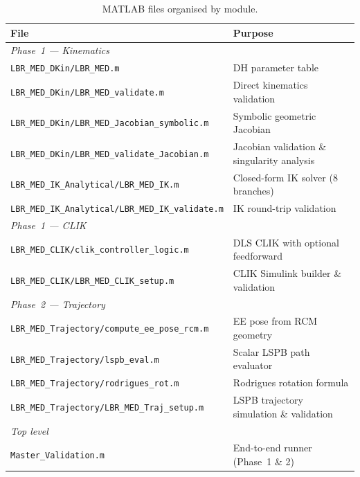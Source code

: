 \documentclass[11pt,a4paper]{article}
\begin{document}
\begin{table}[H]
  \centering
  \caption{MATLAB files organised by module.}
  \begin{tabular}{ll}
    \toprule
    File & Purpose \\
    \midrule
    \multicolumn{2}{l}{\textit{Phase~1 — Kinematics}} \\
    \texttt{LBR\_MED\_DKin/LBR\_MED.m}                       & DH parameter table \\
    \texttt{LBR\_MED\_DKin/LBR\_MED\_validate.m}              & Direct kinematics validation \\
    \texttt{LBR\_MED\_DKin/LBR\_MED\_Jacobian\_symbolic.m}    & Symbolic geometric Jacobian \\
    \texttt{LBR\_MED\_DKin/LBR\_MED\_validate\_Jacobian.m}    & Jacobian validation \& singularity analysis \\
    \texttt{LBR\_MED\_IK\_Analytical/LBR\_MED\_IK.m}          & Closed-form IK solver (8 branches) \\
    \texttt{LBR\_MED\_IK\_Analytical/LBR\_MED\_IK\_validate.m}& IK round-trip validation \\
    \midrule
    \multicolumn{2}{l}{\textit{Phase~1 — CLIK}} \\
    \texttt{LBR\_MED\_CLIK/clik\_controller\_logic.m}          & DLS CLIK with optional feedforward \\
    \texttt{LBR\_MED\_CLIK/LBR\_MED\_CLIK\_setup.m}           & CLIK Simulink builder \& validation \\
    \midrule
    \multicolumn{2}{l}{\textit{Phase~2 — Trajectory}} \\
    \texttt{LBR\_MED\_Trajectory/compute\_ee\_pose\_rcm.m}     & EE pose from RCM geometry \\
    \texttt{LBR\_MED\_Trajectory/lspb\_eval.m}                 & Scalar LSPB path evaluator \\
    \texttt{LBR\_MED\_Trajectory/rodrigues\_rot.m}             & Rodrigues rotation formula \\
    \texttt{LBR\_MED\_Trajectory/LBR\_MED\_Traj\_setup.m}      & LSPB trajectory simulation \& validation \\
    \midrule
    \multicolumn{2}{l}{\textit{Top level}} \\
    \texttt{Master\_Validation.m}                              & End-to-end runner (Phase~1 \& 2) \\
    \bottomrule
  \end{tabular}
\end{table}
\end{document}
